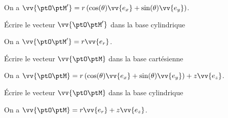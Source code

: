 
\begin{corrige}
	On a $\vv{\ptO \ptM'}=r \left(\cos(\theta) \vv{e_x}+\sin(\theta) \vv{e_y}\right)$.
\end{corrige}




\begin{enonce}
	Écrire le vecteur $\vv{\ptO \ptM'}$ dans la base cylindrique
\end{enonce}


\begin{corrige}
	On a $\vv{\ptO \ptM'}=r \vv{e_r}$.
\end{corrige}




\begin{enonce}
Écrire le vecteur $\vv{\ptO \ptM}$ dans la base cartésienne
\end{enonce}


\begin{corrige}
	On a $\vv{\ptO \ptM}=r \left(\cos(\theta) \vv{e_x}+\sin(\theta) \vv{e_y}\right) +z\vv{e_z}$.
\end{corrige}




\begin{enonce}
	Écrire le vecteur $\vv{\ptO \ptM}$ dans la base cylindrique 
\end{enonce}


\begin{corrige}
	On a $\vv{\ptO \ptM}=r \vv{e_r}+z\vv{e_z}$.
\end{corrige}

